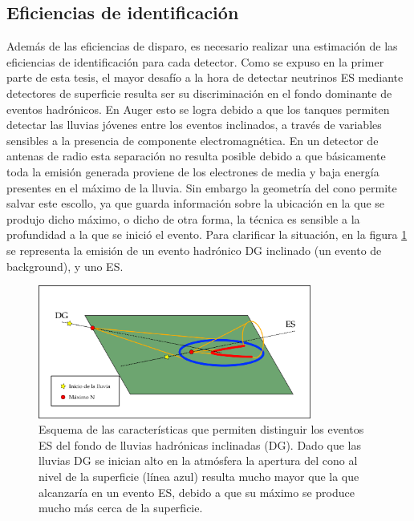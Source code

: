 	\clearpage
	\subsection{Eficiencias de identificaci\'on}
	\label{sc:identificacionRadio}
	
	Adem\'as de las eficiencias de disparo, es necesario realizar una estimaci\'on de las eficiencias de identificaci\'on para cada detector.
	Como se expuso en la primer parte de esta tesis, el mayor desaf\'io a la hora de detectar neutrinos ES mediante detectores de superficie resulta ser su discriminaci\'on en el fondo dominante de eventos hadr\'onicos.
	En Auger esto se logra debido a que los tanques \cher{} permiten detectar las lluvias j\'ovenes entre los eventos inclinados, a trav\'es de variables sensibles a la presencia de componente electromagn\'etica.
	En un detector de antenas de radio esta separaci\'on no resulta posible debido a que b\'asicamente toda la emisi\'on generada proviene de los electrones de media y baja energ\'ia presentes en el m\'aximo de la lluvia.
	Sin embargo la geometr\'ia del cono \cher{} permite salvar este escollo, ya que guarda informaci\'on sobre la ubicaci\'on en la que se produjo dicho m\'aximo, o dicho de otra forma, la t\'ecnica es sensible a la profundidad a la que se inici\'o el evento.
	Para clarificar la situaci\'on, en la figura \ref{fig:dg_vs_es_radio} se representa la emisi\'on de un evento hadr\'onico DG inclinado (un evento de background), y uno ES.
	\begin{figure}[ht!]
		\centering
		\includegraphics[width=0.8\textwidth]{./fig/simulacionRadio/idRadio.png}
		\caption{\label{fig:dg_vs_es_radio}
		Esquema de las caracter\'isticas que permiten distinguir los eventos ES del fondo de lluvias hadr\'onicas inclinadas (DG). Dado que las lluvias DG se inician alto en la atm\'osfera la apertura del cono \cher{} al nivel de la superficie (l\'inea azul) resulta mucho mayor que la que alcanzar\'ia en un evento ES, debido a que su m\'aximo se produce mucho m\'as cerca de la superficie.
		}
	\end{figure}
